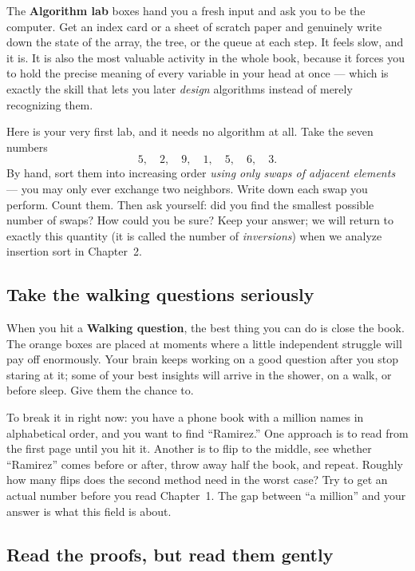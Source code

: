 The \textbf{Algorithm lab} boxes hand you a fresh input and ask you to be the
computer. Get an index card or a sheet of scratch paper and genuinely write down
the state of the array, the tree, or the queue at each step. It feels slow, and
it is. It is also the most valuable activity in the whole book, because it
forces you to hold the precise meaning of every variable in your head at once ---
which is exactly the skill that lets you later \emph{design} algorithms instead of
merely recognizing them.

\begin{labbox}
Here is your very first lab, and it needs no algorithm at all. Take the seven
numbers
\[
  5,\quad 2,\quad 9,\quad 1,\quad 5,\quad 6,\quad 3.
\]
By hand, sort them into increasing order \emph{using only swaps of adjacent
elements} --- you may only ever exchange two neighbors. Write down each swap you
perform. Count them. Then ask yourself: did you find the smallest possible number
of swaps? How could you be sure? Keep your answer; we will return to exactly this
quantity (it is called the number of \emph{inversions}) when we analyze insertion
sort in Chapter~2.
\end{labbox}

\subsection*{Take the walking questions seriously}

When you hit a \textbf{Walking question}, the best thing you can do is close the
book. The orange boxes are placed at moments where a little independent struggle
will pay off enormously. Your brain keeps working on a good question after you
stop staring at it; some of your best insights will arrive in the shower, on a
walk, or before sleep. Give them the chance to.

\begin{walkbox}
To break it in right now: you have a phone book with a million names in
alphabetical order, and you want to find ``Ramirez.'' One approach is to read from
the first page until you hit it. Another is to flip to the middle, see whether
``Ramirez'' comes before or after, throw away half the book, and repeat. Roughly
how many flips does the second method need in the worst case? Try to get an actual
number before you read Chapter~1. The gap between ``a million'' and your answer is
what this field is about.
\end{walkbox}

\subsection*{Read the proofs, but read them gently}

